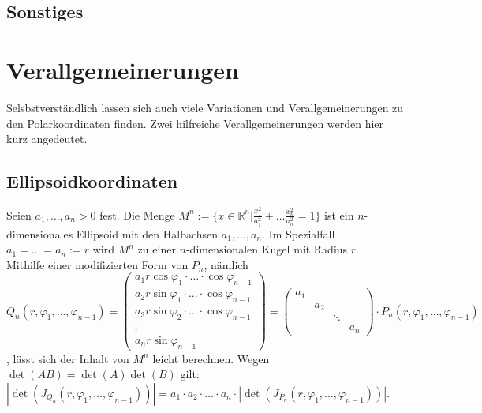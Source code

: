 \documentclass[a4paper,11pt]{report}
\theoremstyle{definition}
\newcommand{\R}{{\ensuremath{\mathbb{R}}}}
\begin{document}
\section{Sonstiges}%
\chapter{Verallgemeinerungen}
Selsbstverständlich lassen sich auch viele Variationen und Verallgemeinerungen zu den Polarkoordinaten finden. Zwei hilfreiche Verallgemeinerungen werden hier kurz angedeutet.
\section{\glqq Ellipsoidkoordinaten\grqq}%
Seien $a_1,\ldots,a_n>0$ fest. Die Menge $M^n:=\{x\in\R^n|\frac{x_1^2}{a_1^2}+\ldots\frac{x_n^2}{a_n^2}=1\}$ ist ein $n$-dimensionales Ellipsoid mit den Halbachsen $a_1,\ldots,a_n$. Im Spezialfall $a_1=\ldots=a_n:=r$ wird $M^n$ zu einer $n$-dimensionalen Kugel mit Radius $r$.\\
Mithilfe einer modifizierten Form von $P_n$, nämlich\\ $Q_n(r,\varphi_1,\ldots,\varphi_{n-1})=\begin{pmatrix}a_1r\cos\varphi_1\cdot\ldots\cdot\cos\varphi_{n-1} \\ a_2r\sin\varphi_1\cdot\ldots\cdot\cos\varphi_{n-1} \\
a_3r\sin\varphi_2\cdot\ldots\cdot\cos\varphi_{n-1} \\
\vdots \\
a_nr \sin\varphi_{n-1}
\end{pmatrix}=\begin{pmatrix}a_1 & & & \\ & a_2 & & \\ & & \ddots & \\ & & & a_n\end{pmatrix}\cdot P_n(r,\varphi_1,\ldots,\varphi_{n-1})$,
lässt sich der Inhalt von $M^n$ leicht berechnen. Wegen $\det(AB)=\det(A)\det(B)$ gilt:\\
$|\det(J_{Q_n}(r,\varphi_1,\ldots,\varphi_{n-1}))|=
a_1\cdot a_2\cdot\ldots\cdot a_n\cdot|\det(J_{P_n}(r,\varphi_1,\ldots,\varphi_{n-1}))|$.
\end{document}

